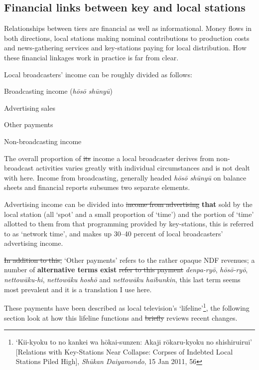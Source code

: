 \documentclass[11pt, oneside, a4paper, headsepline]{scrartcl}
\newenvironment{close_enum}{
\begin{enumerate}
 \setlength{\itemsep}{1pt}
 \setlength{\parskip}{1pt}
 \setlength{\parsep}{0pt}}{\end{enumerate}
}
\begin{document}
\subsection{Financial links between key and local stations}
\label{net-finances}
Relationships between tiers are financial as well as informational. Money flows in both directions, local stations making nominal contributions to production costs and news-gathering services and key-stations paying for local distribution. How these financial linkages work in practice is far from clear.

\bigskip

Local broadcasters' income can be roughly divided as follows:
\begin{close_enum}
\item Broadcasting income (\emph{hōsō shūnyū})
	\begin{close_enum}
	\item Advertising sales
	\item Other payments
	\end{close_enum}
\item Non-broadcasting income	
\end{close_enum}

The overall proportion of \st{its} income a local broadcaster derives from non-broadcast activities varies greatly with individual circumstances and is not dealt with here. Income from broadcasting, generally headed \emph{hōsō shūnyū} on balance sheets and financial reports subsumes two separate elements.

Advertising income can be divided into \st{income from advertising} \textbf{that} sold by the local station (all `spot' and a small proportion of `time') and the portion of `time' allotted to them from that programming provided by key-stations, this is referred to as `network time', and makes up 30--40 percent of local broadcasters' advertising income.

\st{In addition to this, }`Other payments' refers to the rather opaque NDF revenues; a number of \textbf{alternative terms exist} \st{refer to this payment} \emph{denpa-ry\={o}}, \emph{h\={o}s\={o}-ry\={o}}, \emph{nettow\={a}ku-hi}, \emph{nettow\={a}ku hosh\={o}} and \emph{nettow\={a}ku haibunkin}, this last term seems most prevalent and it is a translation I use here.

These payments have been described as local television's `lifeline'\footnote{`Kii-kyoku to no kankei wa h\={o}kai-sunzen: Akaji r\={o}karu-kyoku no shishiruirui' [Relations with Key-Stations Near Collapse: Corpses of Indebted Local Stations Piled High], \emph{Sh\={u}kan Daiyamondo}, 15 Jan 2011, 56\label{note:shishi}}, the following section look at how this lifeline functions and \st{briefly} reviews recent changes.
\end{document}
